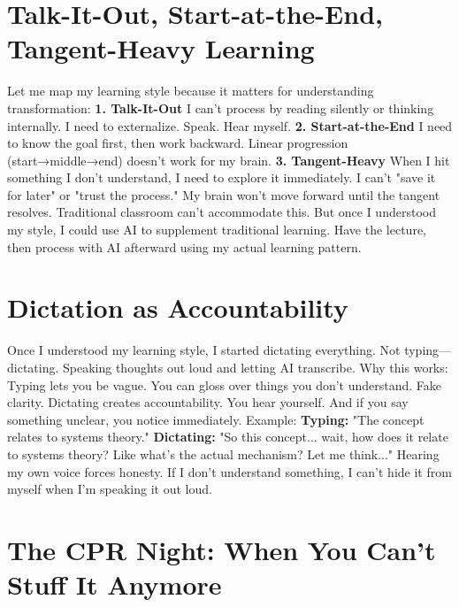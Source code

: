 \documentclass[12pt,openany]{book}
\begin{document}
\section{Talk-It-Out, Start-at-the-End, Tangent-Heavy Learning}

Let me map my learning style because it matters for understanding transformation:
\textbf{1. Talk-It-Out}
I can't process by reading silently or thinking internally. I need to externalize. Speak. Hear myself.
\textbf{2. Start-at-the-End}
I need to know the goal first, then work backward. Linear progression (start→middle→end) doesn't work for my brain.
\textbf{3. Tangent-Heavy}
When I hit something I don't understand, I need to explore it immediately. I can't "save it for later" or "trust the process." My brain won't move forward until the tangent resolves.
Traditional classroom can't accommodate this.
But once I understood my style, I could use AI to supplement traditional learning. Have the lecture, then process with AI afterward using my actual learning pattern.

\section{Dictation as Accountability}

Once I understood my learning style, I started dictating everything.
Not typing—dictating. Speaking thoughts out loud and letting AI transcribe.
Why this works:
Typing lets you be vague. You can gloss over things you don't understand. Fake clarity.
Dictating creates accountability. You hear yourself. And if you say something unclear, you notice immediately.
Example:
\textbf{Typing:} "The concept relates to systems theory."
\textbf{Dictating:} "So this concept... wait, how does it relate to systems theory? Like what's the actual mechanism? Let me think..."
Hearing my own voice forces honesty.
If I don't understand something, I can't hide it from myself when I'm speaking it out loud.

\section{The CPR Night: When You Can't Stuff It Anymore}
\end{document}
